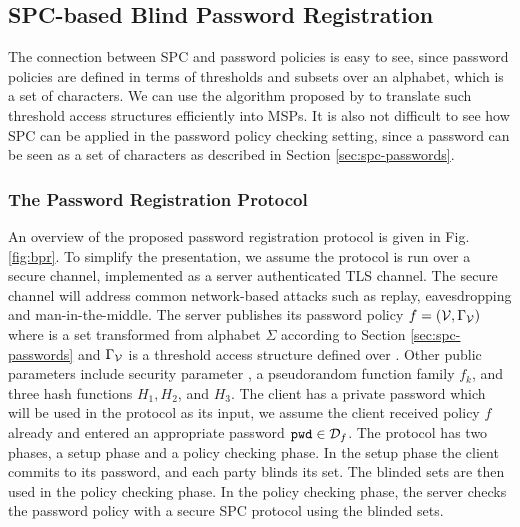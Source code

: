 \subsection{SPC-based Blind Password Registration}\label{sec:spc-bpr-protocol}

The connection between \acl{SPC} and password policies is easy to see, since password policies are defined in terms of thresholds and subsets over an alphabet, which is a set of characters.
We can use the algorithm proposed by \citet{LiuC10} to translate such threshold access structures efficiently into \acp{MSP}. 
It is also not difficult to see how \ac{SPC} can be applied in the password policy checking setting, since a password can be seen as a set of characters as described in Section \ref{sec:spc-passwords}. 

\subsubsection{The Password Registration Protocol}
An overview of the proposed password registration protocol is given in Fig. \ref{fig:bpr}. 
To simplify the presentation, we assume the protocol is run over a secure channel, \eg implemented as a server authenticated \ac{TLS} channel. 
The secure channel will address common network-based attacks such as replay, eavesdropping and man-in-the-middle. 
The server publishes its password policy $f=(\mathcal{V},\Gamma_\mathcal{V})$ where \ServerSet is a set transformed from alphabet $\Sigma$ according to Section \ref{sec:spc-passwords} and $\Gamma_\mathcal{V}$ is a threshold access structure defined over \ServerSet. 
Other public parameters include security parameter \secpar, a pseudorandom function family $f_k$, and three hash functions $H_1, H_2$, and $H_3$. 
The client has a private password \pwd which will be used in the protocol as its input, \ie we assume the client received policy $f$ already and entered an appropriate password $\mathtt{pwd}\in\mathcal{D}_f$. 
The protocol has two phases, a setup phase and a policy checking phase. 
In the setup phase the client commits to its password, and each party blinds its set. 
The blinded sets are then used in the policy checking phase. In the policy checking phase, the server checks the password policy with a secure \ac{SPC} protocol using the blinded sets.

